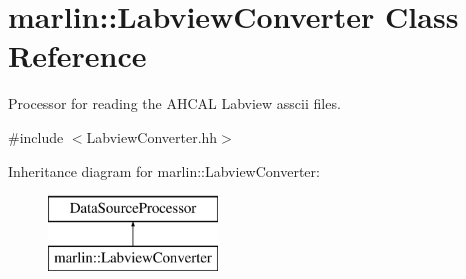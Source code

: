 \section{marlin\-:\-:Labview\-Converter Class Reference}
\label{classmarlin_1_1LabviewConverter}


Processor for reading the A\-H\-C\-A\-L Labview asscii files.  




{\ttfamily \#include $<$Labview\-Converter.\-hh$>$}

Inheritance diagram for marlin\-:\-:Labview\-Converter\-:\begin{figure}[H]
\begin{center}
\leavevmode
\includegraphics[height=2.000000cm]{classmarlin_1_1LabviewConverter}
\end{center}
\end{figure}
